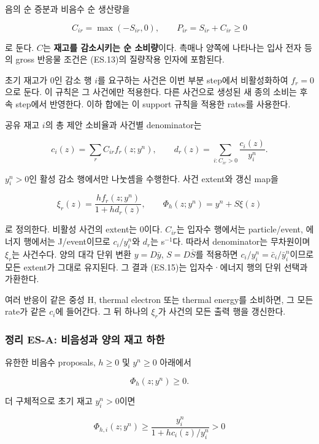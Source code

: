 음의 순 증분과 비음수 순 생산량을

\[
C_{ir}=\max(-S_{ir},0),\qquad P_{ir}=S_{ir}+C_{ir}\ge0
\]

로 둔다. \(C\)는 \textbf{재고를 감소시키는 순 소비량}이다. 촉매나 양쪽에 나타나는 입사 전자 등의 gross 반응물 조건은 (ES.13)의 질량작용 인자에 포함된다.

초기 재고가 0인 감소 행 \(i\)를 요구하는 사건은 이번 부분 step에서 비활성화하여 \(f_r=0\)으로 둔다. 이 규칙은 그 사건에만 적용한다. 다른 사건으로 생성된 새 종의 소비는 후속 step에서 반영한다. 이하 합에는 이 support 규칙을 적용한 rates를 사용한다.

공유 재고 \(i\)의 총 제안 소비율과 사건별 denominator는

\[
c_i(z)=\sum_r C_{ir}f_r(z;y^n),\qquad
d_r(z)=\sum_{i:C_{ir}>0}\frac{c_i(z)}{y_i^n}.
\tag{ES.14}
\]

\(y_i^n>0\)인 활성 감소 행에서만 나눗셈을 수행한다. 사건 extent와 갱신 map을

\[
\boxed{
\xi_r(z)=\frac{h f_r(z;y^n)}{1+h d_r(z)},\qquad
\Phi_h(z;y^n)=y^n+S\xi(z)
}
\tag{ES.15}
\]

로 정의한다. 비활성 사건의 extent는 0이다. \(C_{ir}\)는 입자수 행에서는 particle/event, 에너지 행에서는 J/event이므로 \(c_i/y_i^n\)와 \(d_r\)는 s\(^{-1}\)다. 따라서 denominator는 무차원이며 \(\xi_r\)는 사건수다. 양의 대각 단위 변환 \(y=D\bar y\), \(S=D\bar S\)를 적용하면 \(c_i/y_i^n=\bar c_i/\bar y_i^n\)이므로 모든 extent가 그대로 유지된다. 그 결과 (ES.15)는 입자수·에너지 행의 단위 선택과 가환한다.

여러 반응이 같은 중성 H, thermal electron 또는 thermal energy를 소비하면, 그 모든 rate가 같은 \(c_i\)에 들어간다. 그 뒤 하나의 \(\xi_r\)가 사건의 모든 출력 행을 갱신한다.

\hypertarget{uxc815uxb9ac-es-a-uxbe44uxc74cuxc131uxacfc-uxc591uxc758-uxc7acuxace0-uxd558uxd55c}{%
\subsubsection{정리 ES-A: 비음성과 양의 재고 하한}\label{uxc815uxb9ac-es-a-uxbe44uxc74cuxc131uxacfc-uxc591uxc758-uxc7acuxace0-uxd558uxd55c}}

유한한 비음수 proposals, \(h\ge0\) 및 \(y^n\ge0\) 아래에서

\[
\Phi_h(z;y^n)\ge0.
\]

더 구체적으로 초기 재고 \(y_i^n>0\)이면

\[
\boxed{
\Phi_{h,i}(z;y^n)\ge
\frac{y_i^n}{1+h c_i(z)/y_i^n}>0
}
\tag{ES.16}
\]

